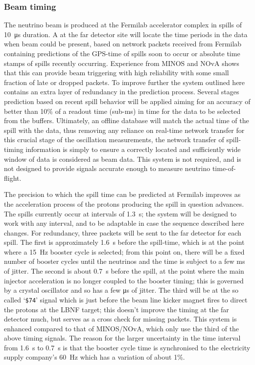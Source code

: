 

\subsubsection{Beam timing}
\label{sec:fd-daq-design-beamtiming}

The neutrino beam is produced at the Fermilab accelerator complex in
spills of \SI{10}{\us} duration. 
A  at the far detector site will locate the time periods in
the data when beam could be present, based on network packets received
from Fermilab containing predictions of the GPS-time of spills soon to
occur or absolute time stamps of spills recently occurring. 
Experience from MINOS and NOvA shows that this can provide beam
triggering with high reliability with some small fraction of late or
dropped packets.
To improve further the system outlined here contains an extra layer
of redundancy in the prediction process. 
Several stages prediction based on recent spill behavior will be applied aiming
for an accuracy of better than 10\% of a readout
time (sub-\si{\ms}) in time for the data to be selected from
the  buffers. 
Ultimately, an offline database will match the actual time of the
spill with the data, thus removing any reliance on real-time network
transfer for this crucial stage of the oscillation measurements, the
network transfer of spill-timing information is simply to ensure a
correctly located and sufficiently wide window of data is considered
as beam data. This system is not required, and is not designed to
provide signals accurate enough to measure neutrino time-of-flight.

The precision to which the spill time can be predicted at Fermilab
improves as the acceleration process of the protons producing the
spill in question advances.  The spills currently occur at intervals
of \SI{1.3}{\s}; the system will be designed to work with any interval, and
to be adaptable in case the sequence described here changes.  For
redundancy, three packets will be sent to the far detector for each
spill.  The first is approximately \SI{1.6}{\s} before the spill-time, which
is at the point where a \SI{15}{\Hz} booster cycle is selected; from this
point on, there will be a fixed number of booster cycles until the
neutrinos and the time is subject to a few ms of jitter.  The second
is about \SI{0.7}{\s} before the spill, at the point where the main injector
acceleration is no longer coupled to the booster timing; this is
governed by a crystal oscillator and so has a few \si{\us} of jitter.
The third will be at the so called `\texttt{\$74}' signal which is just before the beam line kicker magnet fires
to direct the protons at the LBNF target; this doesn't improve the
timing at the far detector much, but serves as a cross check for
missing packets.  This system is enhanced compared to that of
MINOS/NOvA, which only use the third of the above timing signals.  The
reason for the larger uncertainty in the time interval from \SI{1.6}{\s} to
\SI{0.7}{\s} is that the booster cycle time is synchronised to the
electricity supply company's \SI{60}{\Hz} which has a variation of about
1\%.

